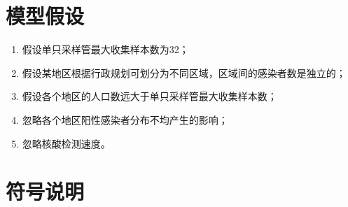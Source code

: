 \documentclass[withoutpreface,bwprint]{cumcmthesis} %
\begin{document}
\section{模型假设}
\begin{enumerate}
    \item 假设单只采样管最大收集样本数为32\cite{max_maps}；
    \item 假设某地区根据行政规划可划分为不同区域，区域间的感染者数是独立的；
    \item 假设各个地区的人口数远大于单只采样管最大收集样本数；
    \item 忽略各个地区阳性感染者分布不均产生的影响；
    \item 忽略核酸检测速度。
\end{enumerate}

\section{符号说明}
\end{document}
